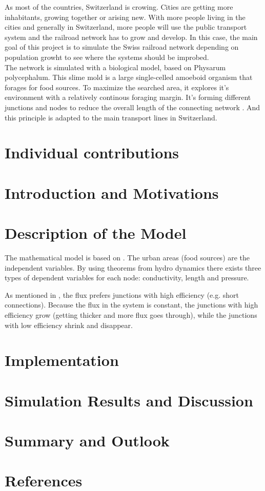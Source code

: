 \documentclass[11pt]{article}
\begin{document}
As most of the countries, Switzerland is crowing. Cities are getting more inhabitants, growing together or arising new. With more people living in the cities and generally in Switzerland, more people will use the public transport system and the railroad network has to grow and develop. In this case, the main goal of this project is to simulate the Swiss railroad network depending on population growht to see where the systems should be improbed.~\\
The network is simulated with a biological model, based on Physarum polycephalum. This slime mold is a large single-celled amoeboid organism that forages for food sources. To maximize the searched area, it explores it's environment with a relatively continous foraging margin. It's forming different junctions and nodes to reduce the overall length of the connecting network \cite{network_tokyo}. And this principle is adapted to the main transport lines in Switzerland.

 


\section{Individual contributions}




\section{Introduction and Motivations}

\section{Description of the Model}

The mathematical model is based on \cite{network_model}. The urban areas (food sources) are the independent variables. By using theorems from hydro dynamics there exists three types of dependent variables for each node: conductivity, length and pressure.

As mentioned in \cite{network_model}, the flux prefers junctions with high efficiency (e.g. short connections). Because the flux in the system is constant, the junctions with high efficiency grow (getting thicker and more flux goes through), while the junctions with low efficiency shrink and disappear.


\section{Implementation}

\section{Simulation Results and Discussion}

\section{Summary and Outlook}

\section{References}



\end{document}
